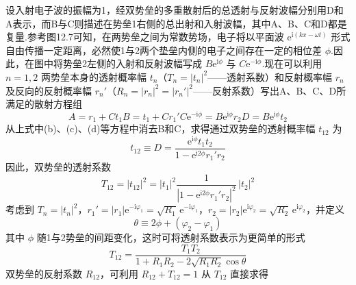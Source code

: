 设入射电子波的振幅为1，经双势垒的多重散射后的总透射与反射波幅分别用D和A表示，而B与C则描述在势垒1右侧的总出射和入射波幅，其中A、B、C和D都是复量.参考图12.7可知，在两势垒之间为常数势场，电子将以平面波 $\mathrm{e}^{\mathrm{i}\left(kx-\omega t\right)}$ 形式自由传播一定距离，必然使1与2两个垫垒内侧的电子之间存在一定的相位差 $\phi$.因此，在图中将势垒2左侧的入射和反射波幅写成 $B\mathrm{e}^{\mathrm{i}\phi}$ 与 $C\mathrm{e}^{-\mathrm{i}\phi}$.现在可以利用 $n=1,2$ 两势垒本身的透射概率幅 $t_{n}$（$T_{n}=|t_{n}|^{2}$——透射系数）和反射概率幅 $r_{n}$ 及反向的反射概率幅 $r_{n}'$（$R_{n}=|r_{n}|^{2}=|r_{n}'|^{2}$——反射系数）写出A、B、C、D所满足的散射方程组
\begin{subequations}
\begin{equation}
  A=r_{1}+Ct_{1}
\end{equation}
\begin{equation}
  B=t_{1}+Cr_{1}'
\end{equation}
\begin{equation}
  C\mathrm{e}^{-\mathrm{i}\phi}=B\mathrm{e}^{\mathrm{i}\phi}r_{2}
\end{equation}
\begin{equation}
  D=B\mathrm{e}^{\mathrm{i}\phi}t_{2}
\end{equation}
\end{subequations}
从上式中(b)、(c)、(d)等方程中消去B和C，求得通过双势垒的透射概率幅 $t_{12}$ 为
\begin{equation}
  t_{12}\equiv D=\frac{\mathrm{e}^{\mathrm{i}\phi}t_{1}t_{2}}
  {1-\mathrm{e}^{\mathrm{i}2\phi}r_{1}'r_{2}}
\end{equation}
因此，双势垒的透射系数
\begin{equation}
  T_{12}=|t_{12}|^{2}=|t_{1}|^{2}
  \frac{1}{|1-\mathrm{e}^{\mathrm{i}2\phi}r_{1}'r_{2}|^{2}}\,|t_{2}|^{2}
\end{equation}
考虑到 $T_{n}=|t_{n}|^{2}$，$r_{1}'=|r_{1}|\mathrm{e}^{-\mathrm{i}\varphi_{1}}=\sqrt{R_{1}}\,\mathrm{e}^{-\mathrm{i}\varphi_{1}}$，$r_{2}=|r_{2}|\mathrm{e}^{\mathrm{i}\varphi_{2}}=\sqrt{R_{2}}\,\mathrm{e}^{\mathrm{i}\varphi_{2}}$，并定义
\begin{equation}
  \theta\equiv 2\phi+\left(\varphi_{2}-\varphi_{1}\right)
\end{equation}
其中 $\phi$ 随1与2势垒的间距变化，这时可将透射系数表示为更简单的形式
\begin{equation}
  T_{12}=\frac{T_{1}T_{2}}{1+R_{1}R_{2}-2\sqrt{R_{1}R_{2}}\cos\theta}
\end{equation}
双势垒的反射系数 $R_{12}$，可利用 $R_{12}+T_{12}=1$ 从 $T_{12}$ 直接求得
